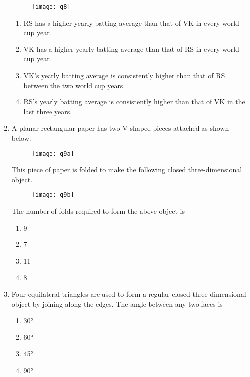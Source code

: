 \documentclass[journal,11pt,onecolumn]{IEEEtran}
\begin{document}
\begin{enumerate}[resume]
          \begin{figure}[H]
              \centering
              \texttt{[image: q8]}
              \caption{}
              \label{fig:q8}
          \end{figure}

          \begin{enumerate}
              \item RS has a higher yearly batting average than that of VK in every world cup year.
              \item VK has a higher yearly batting average than that of RS in every world cup year.
              \item VK's yearly batting average is consistently higher than that of RS between the two world cup years.
              \item RS's yearly batting average is consistently higher than that of VK in the last three years.
          \end{enumerate}

    \item A planar rectangular paper has two V-shaped pieces attached as shown below.
          \begin{figure}[H]
              \centering
              \texttt{[image: q9a]}
              \caption{}
              \label{fig:q9a}
          \end{figure}
          This piece of paper is folded to make the following closed three-dimensional object.
          \begin{figure}[H]
              \centering
              \texttt{[image: q9b]}
              \caption{}
              \label{fig:q9}
          \end{figure}
          The number of folds required to form the above object is

          \begin{enumerate}
              \item 9
              \item 7
              \item 11
              \item 8
          \end{enumerate}

    \item Four equilateral triangles are used to form a regular closed three-dimensional object by joining along the edges. The angle between any two faces is

          \begin{enumerate}
              \item 30°
              \item 60°
              \item 45°
              \item 90°
          \end{enumerate}

\end{enumerate}
\end{document}
